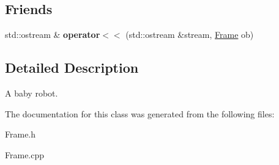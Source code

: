 \subsection*{Friends}
\begin{DoxyCompactItemize}
\item 
\hypertarget{classFrame_aa5868d66c4a975c7393691c0647aedd4}{
std::ostream \& {\bfseries operator$<$$<$} (std::ostream \&stream, \hyperlink{classFrame}{Frame} ob)}
\label{classFrame_aa5868d66c4a975c7393691c0647aedd4}

\end{DoxyCompactItemize}


\subsection{Detailed Description}
A baby robot. 

The documentation for this class was generated from the following files:\begin{DoxyCompactItemize}
\item 
Frame.h\item 
Frame.cpp\end{DoxyCompactItemize}
